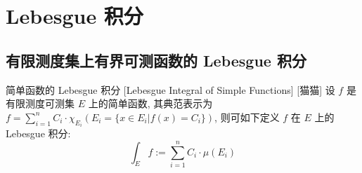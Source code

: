 \documentclass[UTF8]{ctexart}
\begin{document}
    \section{Lebesgue 积分} %

        \subsection{有限测度集上有界可测函数的 Lebesgue 积分}
            
            \begin{dfn}
                {简单函数的 Lebesgue 积分}
                [Lebesgue Integral of Simple Functions]
                [猫猫]
                设 \(f\) 是有限测度可测集 \(E\) 上的简单函数, 其典范表示为 \(f=\sum\limits_{i=1}^{n}C_i\cdot\chi_{E_i}(E_i=\{x\in E_i|f(x)=C_i\})\), 则可如下定义 \(f\) 在 \(E\) 上的 Lebesgue 积分: 
                \[\int_E f:=\sum_{i=1}^n C_i\cdot\mu(E_i)\]
            \end{dfn}
\end{document}
